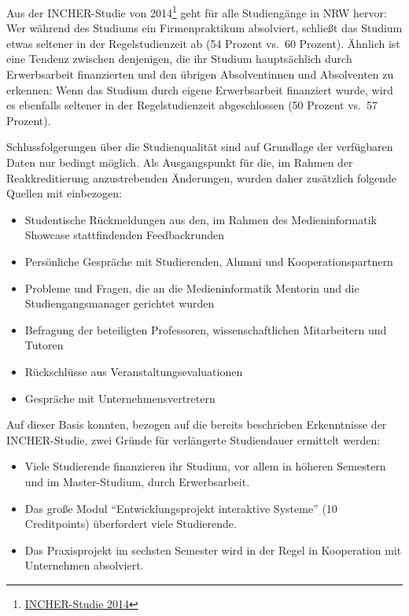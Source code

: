 Aus der INCHER-Studie von 2014\footnote{\href{../anhaenge/INCHER-Studie.pdf}{INCHER-Studie
  2014}} geht für alle Studiengänge in NRW hervor: Wer während des
Studiums ein Firmenpraktikum absolviert, schließt das Studium etwas
seltener in der Regelstudienzeit ab (54 Prozent vs.~60 Prozent). Ähnlich
ist eine Tendenz zwischen denjenigen, die ihr Studium hauptsächlich
durch Erwerbsarbeit finanzierten und den übrigen Absolventinnen und
Absolventen zu erkennen: Wenn das Studium durch eigene Erwerbsarbeit
finanziert wurde, wird es ebenfalls seltener in der Regelstudienzeit
abgeschlossen (50 Prozent vs.~57 Prozent).

Schlussfolgerungen über die Studienqualität sind auf Grundlage der
verfügbaren Daten nur bedingt möglich. Als Ausgangspunkt für die, im
Rahmen der Reakkreditierung anzustrebenden Änderungen, wurden daher
zusätzlich folgende Quellen mit einbezogen:

\begin{itemize}
\tightlist
\item
  Studentische Rückmeldungen aus den, im Rahmen des Medieninformatik
  Showcase stattfindenden Feedbackrunden
\item
  Persönliche Gespräche mit Studierenden, Alumni und
  Kooperationspartnern
\item
  Probleme und Fragen, die an die Medieninformatik Mentorin und die
  Studiengangsmanager gerichtet wurden
\item
  Befragung der beteiligten Professoren, wissenschaftlichen Mitarbeitern
  und Tutoren
\item
  Rückschlüsse aus Veranstaltungsevaluationen
\item
  Gespräche mit Unternehmensvertretern
\end{itemize}

Auf dieser Basis konnten, bezogen auf die bereits beschrieben
Erkenntnisse der INCHER-Studie, zwei Gründe für verlängerte Studiendauer
ermittelt werden:

\begin{itemize}
\tightlist
\item
  Viele Studierende finanzieren ihr Studium, vor allem in höheren
  Semestern und im Master-Studium, durch Erwerbsarbeit.
\item
  Das große Modul ``Entwicklungsprojekt interaktive Systeme'' (10
  Creditpoints) überfordert viele Studierende.
\item
  Das Praxisprojekt im sechsten Semester wird in der Regel in
  Kooperation mit Unternehmen absolviert.
\end{itemize}

